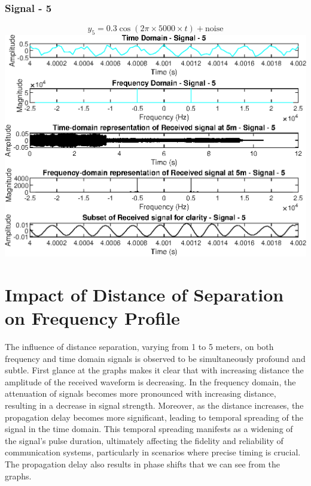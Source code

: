 \documentclass{report}
\begin{document}
\newpage
\subsubsection{Signal - 5}

$$ y_5 = 0.3 \cos(2\pi \times 5000 \times t) + \text{noise} $$
\includegraphics[width=1.1\linewidth]{5_5.eps}


\newpage
\section{Impact of Distance of Separation on Frequency Profile }
The influence of distance separation, varying from 1 to 5 meters, on both frequency and time domain signals is observed to be simultaneously  profound and subtle. First glance at the graphs makes it clear that with increasing distance the amplitude of the received waveform is decreasing. In the frequency domain, the attenuation of signals becomes more pronounced with increasing distance, resulting in a decrease in signal strength. Moreover, as the distance increases, the propagation delay becomes more significant, leading to temporal spreading of the signal in the time domain. This temporal spreading manifests as a widening of the signal's pulse duration, ultimately affecting the fidelity and reliability of communication systems, particularly in scenarios where precise timing is crucial. The propagation delay also results in phase shifts that we can see from the graphs.   
\end{document}
